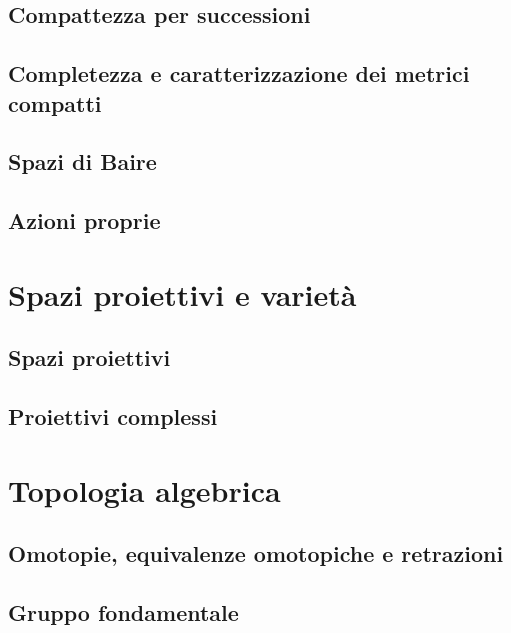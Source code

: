 \documentclass{article}
\begin{document}
\subsection{Compattezza per successioni}


\subsection{Completezza e caratterizzazione dei metrici compatti}


\subsection{Spazi di Baire}


\subsection{Azioni proprie}


\section{Spazi proiettivi e varietà}

\subsection{Spazi proiettivi}


\subsection{Proiettivi complessi}


\section{Topologia algebrica}

\subsection{Omotopie, equivalenze omotopiche e retrazioni}


\subsection{Gruppo fondamentale}

\end{document}
